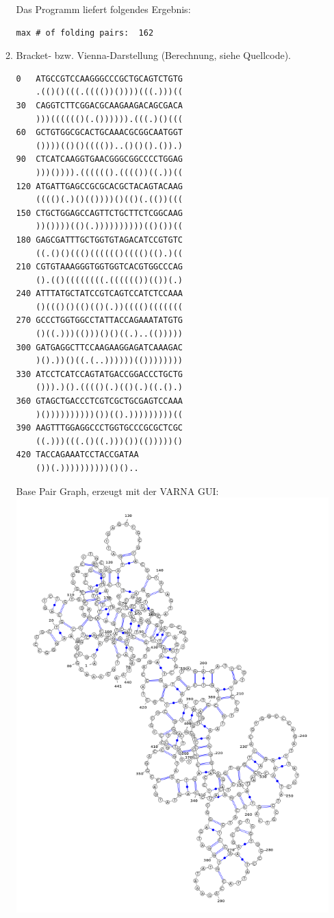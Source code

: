 \documentclass{homework}
\begin{document}
\begin{enumerate}
\begin{enumerate}
Das Programm liefert folgendes Ergebnis:
\begin{verbatim}
max # of folding pairs:  162
\end{verbatim}
\item 
Bracket- bzw. Vienna-Darstellung (Berechnung, siehe Quellcode).
\begin{verbatim}
0   ATGCCGTCCAAGGGCCCGCTGCAGTCTGTG
    .(()()(((.(((())())))(((.)))((
30  CAGGTCTTCGGACGCAAGAAGACAGCGACA
    )))(((((()(.()))))).(((.)()(((
60  GCTGTGGCGCACTGCAAACGCGGCAATGGT
    ())))(()()(((())..()()().()).)
90  CTCATCAAGGTGAACGGGCGGCCCCTGGAG
    )))()))).(((((().(((())((.))((
120 ATGATTGAGCCGCGCACGCTACAGTACAAG
    (((()(.)()(())))()(()(.(())(((
150 CTGCTGGAGCCAGTTCTGCTTCTCGGCAAG
    ))())))(()(.))))))))))(()())((
180 GAGCGATTTGCTGGTGTAGACATCCGTGTC
    ((.()()((()(((((()(((()(().)((
210 CGTGTAAAGGGTGGTGGTCACGTGGCCCAG
    ().(()((((((((.(((((())(())(.)
240 ATTTATGCTATCCGTCAGTCCATCTCCAAA
    ()((()()(()(()(.))(((()(((((((
270 GCCCTGGTGGCCTATTACCAGAAATATGTG
    ()((.)))(()))()()((.)..(()))))
300 GATGAGGCTTCCAAGAAGGAGATCAAAGAC
    )().))()((.(..))))))(())))))))
330 ATCCTCATCCAGTATGACCGGACCCTGCTG
    ())).)().(((()(.)(()(.)((.().)
360 GTAGCTGACCCTCGTCGCTGCGAGTCCAAA
    )())))))))))())(().)))))))))((
390 AAGTTTGGAGGCCCTGGTGCCCGCGCTCGC
    ((.)))(((.()((.)))())(()))))()
420 TACCAGAAATCCTACCGATAA
    ())(.))))))))))()()..
\end{verbatim}
Base Pair Graph, erzeugt mit der VARNA GUI:
\includegraphics[scale=0.25]{../data/u8_aufg27_nussinov}


\end{enumerate}
\end{enumerate}
\end{document}
